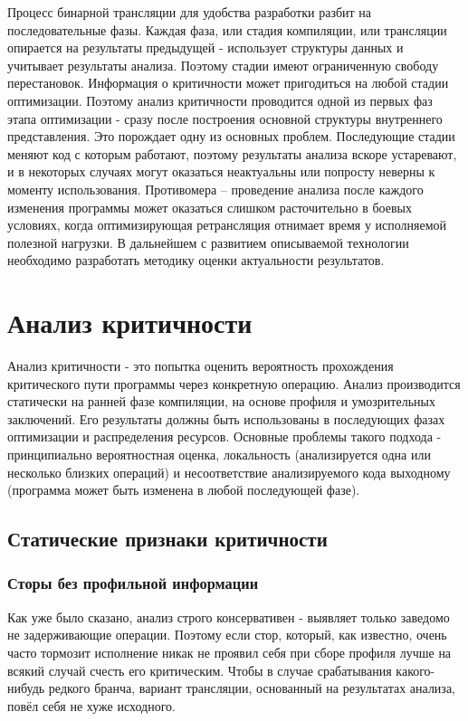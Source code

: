 \documentclass[a4paper,12pt,titlepage]{article}
\begin{document}
Процесс бинарной трансляции для удобства разработки разбит на последовательные фазы. Каждая фаза, или стадия компиляции, или трансляции опирается на результаты предыдущей - использует структуры данных и учитывает результаты анализа. Поэтому стадии имеют ограниченную свободу перестановок.
Информация о критичности может пригодиться на любой стадии оптимизации. Поэтому анализ критичности проводится одной из первых фаз этапа оптимизации - сразу после построения основной структуры внутреннего представления. Это порождает одну из основных проблем. Последующие стадии меняют код с которым работают, поэтому результаты анализа вскоре устаревают, и в некоторых случаях могут оказаться неактуальны или попросту неверны к моменту использования. Противомера -- проведение анализа после каждого изменения программы может оказаться слишком расточительно в боевых условиях, когда оптимизирующая ретрансляция отнимает время у исполняемой полезной нагрузки. В дальнейшем с развитием описываемой технологии необходимо разработать методику оценки актуальности результатов.

\pagebreak
\section{Анализ критичности}
Анализ критичности - это попытка оценить вероятность прохождения критического пути программы через конкретную операцию. Анализ производится статически на ранней фазе компиляции, на основе профиля и умозрительных заключений. Его результаты должны быть использованы в последующих фазах оптимизации и распределения ресурсов. Основные проблемы такого подхода - принципиально вероятностная оценка, локальность (анализируется одна или несколько близких операций) и несоответствие анализируемого кода выходному (программа может быть изменена в любой последующей фазе).
\subsection{Статические признаки критичности}
\label{chap:statsign}
\subsubsection{Сторы без профильной информации}
Как уже было сказано, анализ строго консервативен - выявляет только заведомо не задерживающие операции. Поэтому если стор, который, как известно, очень часто тормозит исполнение никак не проявил себя при сборе профиля лучше на всякий случай счесть его критическим. Чтобы в случае срабатывания какого-нибудь редкого бранча, вариант трансляции, основанный на результатах анализа, повёл себя не хуже исходного.
\end{document}

